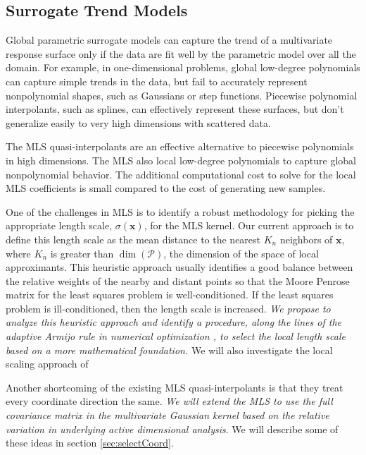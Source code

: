 \documentclass[11pt]{NSFamsart}
\newcommand{\bx}{{\boldsymbol{x}}}
\newcommand{\calp}{{\mathcal{P}}}
\begin{document}
\subsection{Surrogate Trend Models} \label{sec:ourtrend}
Global parametric surrogate models can capture the trend of a multivariate response surface only if the data are fit well by the parametric model over all the domain. For example, in one-dimensional problems, global low-degree polynomials can capture simple trends in the data, but fail to accurately represent nonpolynomial shapes, such as Gaussians or step functions. Piecewise polynomial interpolants, such as splines, can effectively represent these surfaces, but don't generalize easily to very high dimensions with scattered data. 

The MLS quasi-interpolants are an effective alternative to piecewise polynomials in high dimensions. The MLS also local low-degree polynomials to capture global nonpolynomial behavior. The additional computational cost to solve for the local MLS coefficients is small compared to the cost of generating new samples. 

One of the challenges in MLS is to identify a robust methodology for picking the appropriate length scale, $\sigma(\bx)$, for the MLS kernel. Our current approach is to define this length scale as the mean distance to the nearest $K_n$ neighbors of $\bx$, where $K_n$ is greater than $\dim(\calp)$, the dimension of the space of local approximants.
This heuristic approach usually identifies a good balance between the relative weights of the nearby and distant points so that the Moore Penrose matrix for the least squares problem is well-conditioned. If the least squares problem is ill-conditioned, then the length scale is increased. \emph{We propose to analyze this heuristic approach and identify a procedure, along the lines of the adaptive Armijo rule in numerical optimization \cite{kelley1999iterative}, to select the local length scale based on a more mathematical foundation.}  We will also investigate the local scaling approach of \cite{ZelPer05a}

Another shortcoming of the existing MLS quasi-interpolants is that they treat every coordinate direction the same. 
\emph{We will extend the MLS to use the full covariance matrix in the multivariate Gaussian kernel based on the relative variation in underlying active dimensional analysis}. We will describe some of these ideas in section \ref{sec:selectCoord}. 
\end{document}
